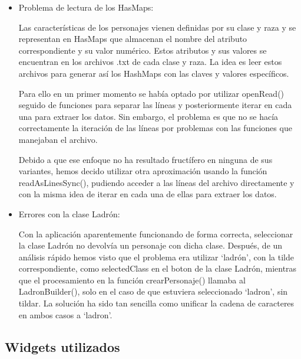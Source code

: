 \documentclass{article}
\begin{document}
\begin{itemize}
    \item Problema de lectura de los HasMaps:
    
    \hspace{1cm}Las características de los personajes vienen definidas por su clase y raza y se representan en HasMaps que almacenan el nombre del atributo correspondiente y su valor numérico. Estos atributos y sus valores se encuentran en los archivos .txt de cada clase y raza. La idea es leer estos archivos para generar así los HashMaps con las claves y valores específicos.
    
    \hspace{1cm}Para ello en un primer momento se había optado por utilizar openRead() seguido de funciones para separar las líneas y posteriormente iterar en cada una para extraer los datos. Sin embargo, el problema es que no se hacía correctamente la iteración de las líneas por problemas con las funciones que manejaban el archivo.

    \hspace{1cm}Debido a que ese enfoque no ha resultado fructífero en ninguna de sus variantes, hemos decido utilizar otra aproximación usando la función readAsLinesSync(), pudiendo acceder a las líneas del archivo directamente y con la misma idea de iterar en cada una de ellas para extraer los datos.


    \item Errores con la clase Ladrón:

    \hspace{1cm}Con la aplicación aparentemente funcionando de forma correcta, seleccionar la clase Ladrón no devolvía un personaje con dicha clase. Después, de un análisis rápido hemos visto que el problema era utilizar `ladrón', con la tilde correspondiente, como selectedClass en el boton de la clase Ladrón, mientras que el procesamiento en la función \textunderscore{}crearPersonaje() llamaba al LadronBuilder(), solo en el caso de que estuviera seleccionado `ladron', sin tildar. La solución ha sido tan sencilla como unificar la cadena de caracteres en ambos casos a `ladron'.
    
\end{itemize}

\subsection{Widgets utilizados}
\end{document}
